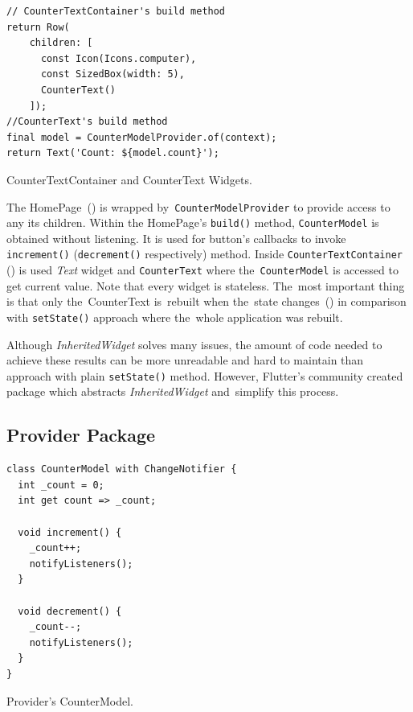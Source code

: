 \begin{listing}[h]
\begin{verbatim}
// CounterTextContainer's build method
return Row(
    children: [
      const Icon(Icons.computer),
      const SizedBox(width: 5),
      CounterText()
    ]);
//CounterText's build method
final model = CounterModelProvider.of(context);
return Text('Count: ${model.count}');
\end{verbatim}
\caption{CounterTextContainer and CounterText Widgets.}
\label{listing:counter-inherited-text-container}
\end{listing}

The HomePage~() is wrapped by~\verb|CounterModelProvider| to provide access to any its children. Within the HomePage's \verb|build()| method, \verb|CounterModel| is obtained without listening. It is used for button's callbacks to invoke \verb|increment()| (\verb|decrement()| respectively) method. Inside \verb|CounterTextContainer| () is used \textit{Text} widget and \verb|CounterText| where the~\verb|CounterModel| is accessed to get current value. Note that every widget is stateless. The~most important thing is that only the~CounterText is~rebuilt when the~state changes~() in comparison with \verb|setState()| approach where the~whole application was rebuilt.

Although \textit{InheritedWidget} solves many issues, the amount of code needed to achieve these results can be more unreadable and hard to maintain than approach with plain \verb|setState()| method. However, Flutter's community created package which abstracts \textit{InheritedWidget} and~simplify this process. 
\subsection{Provider Package}

\begin{listing}[ht]
\begin{verbatim}
class CounterModel with ChangeNotifier {
  int _count = 0;
  int get count => _count;

  void increment() {
    _count++;
    notifyListeners();
  }

  void decrement() {
    _count--;
    notifyListeners();
  }
}
\end{verbatim}
\caption{Provider's CounterModel.}
\label{listing:counter-provider-model}
\end{listing}

